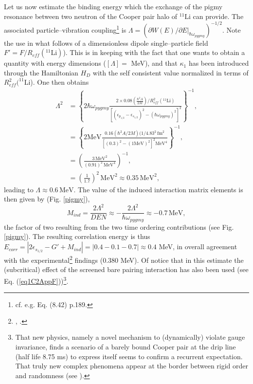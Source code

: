 Let us now estimate the binding energy which the exchange of the pigmy resonance between two neutron of the Cooper pair halo of $^{11}$Li can provide.
The associated particle--vibration coupling\footnote{cf. e.g. \cite{Brink:05} Eq. (8.42) p.189.} is $\Lambda= \left(\partial W(E)/\partial E|_{\hbar\omega_{pygmy}}\right)^{-1/2}$. Note the use in what follows of a dimensionless dipole single--particle field $F'=F/R_{eff}(^{11}\text{Li})$). This is in keeping with the fact that one wants to obtain a quantity with energy dimensions ($[\Lambda]=$ MeV), and that $\kappa_1$ has been introduced through the Hamiltonian $H_D$ with the self consistent value normalized in terms of $R^2_{eff}(^{11}$Li). 
 One then obtains
\begin{equation*}
\begin{split}
\Lambda^2&=\left\{2\hbar \omega_{pygmy}\frac{2\times 0.08(\frac{\hbar^2A}{2M})/R^2_{eff}(^{11}\text{Li})}{\left[(\epsilon_{p_{1/2}}-\epsilon_{s_{1/2}})^2-(\hbar\omega_{pygmy})^2\right]^2}\right\}^{-1},\\
&=\left\{2\text{MeV}\frac{0.16(\hbar^2A/2M)(1/4.83^2\,\text{fm}^2}{\left[(0.3)^2-(1\text{MeV})^2\right]^2\text{MeV}^4}\right\}^{-1},\\
&=\left(\frac{3\,\text{MeV}^2}{(0.91)^2\,\text{MeV}^4}\right)^{-1},\\
&=\left(\frac{1}{1.7}\right)^2\,\text{MeV}^2\approx 0.35\,\text{MeV}^2,
\end{split}
\end{equation*}   
 leading to $\Lambda\approx 0.6\,\text{MeV}$. The value of the induced interaction matrix elements is then given by (Fig. \ref{pigmy}),
 \begin{equation}\label{eq2.F.10}
M_{ind}=\frac{2\Lambda^2}{DEN}\approx-\frac{2\Lambda^2}{\hbar\omega_{pygmy}}\approx-0.7\,\text{MeV},
 \end{equation}
 the factor of two resulting from the two time ordering contributions (see Fig. \ref{pigmy}). The resulting correlation energy is thus $E_{corr}=|2\epsilon_{s_{1/2}}-G'+M_{ind}|=|0.4-0.1-0.7|\approx 0.4$ MeV, in overall agreement with the experimental\footnote{\cite{Bachelet:08}, \cite{Smith:08}.} findings (0.380 MeV). Of notice that in this estimate the (subcritical) effect of the screened bare pairing interaction has also been used (see Eq. (\ref{eq1C2AppF}))\footnote{That new physics, namely a novel mechanism to (dynamically) violate gauge invariance, finds a scenario of a barely bound Cooper pair at the drip line (half life 8.75 ms) to express itself seems to confirm a recurrent expectation. That truly new complex phenomena appear at the border between rigid order and randomness (see \cite{DeGennes:94}).}.
 
